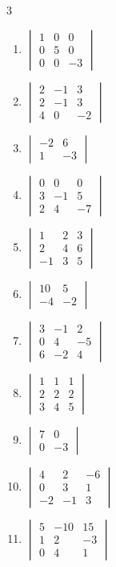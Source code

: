 \begin{multicols}{3}
\begin{enumerate}[label=\arabic*.,  leftmargin=*]
\item $\begin{vmatrix} 1 & 0 & 0 \\ 0 & 5 & 0 \\ 0 & 0 & -3 \end{vmatrix}$
\item $\begin{vmatrix} 2 & -1 & 3 \\ 2 & -1 & 3 \\ 4 & 0 & -2 \end{vmatrix}$
\item $\begin{vmatrix} -2 & 6 \\ 1 & -3 \end{vmatrix}$
\item $\begin{vmatrix} 0 & 0 & 0 \\ 3 & -1 & 5 \\ 2 & 4 & -7 \end{vmatrix}$
\item $\begin{vmatrix} 1 & 2 & 3 \\ 2 & 4 & 6 \\ -1 & 3 & 5 \end{vmatrix}$
\item $\begin{vmatrix} 10 & 5 \\ -4 & -2 \end{vmatrix}$
\item $\begin{vmatrix} 3 & -1 & 2 \\ 0 & 4 & -5 \\ 6 & -2 & 4 \end{vmatrix}$
\item $\begin{vmatrix} 1 & 1 & 1 \\ 2 & 2 & 2 \\ 3 & 4 & 5 \end{vmatrix}$
\item $\begin{vmatrix} 7 & 0 \\ 0 & -3 \end{vmatrix}$
\item $\begin{vmatrix} 4 & 2 & -6 \\ 0 & 3 & 1 \\ -2 & -1 & 3 \end{vmatrix}$
\item $\begin{vmatrix} 5 & -10 & 15 \\ 1 & 2 & -3 \\ 0 & 4 & 1 \end{vmatrix}$

\end{enumerate}
\end{multicols}
